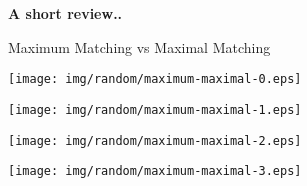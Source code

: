 \begin{frame}{}
	\centering \textbf{\huge A short review..}
\end{frame}

\begin{frame}{Maximum Matching vs Maximal Matching}
	\parbox[c][.7\textheight][c]{\textwidth}{%
{
	\begin{center}
    \texttt{[image: img/random/maximum-maximal-0.eps]}
	\end{center}
}
{
	\begin{center}
    \texttt{[image: img/random/maximum-maximal-1.eps]}
	\end{center}
}
{
	\begin{center}
    \texttt{[image: img/random/maximum-maximal-2.eps]}
	\end{center}
}
{
	\begin{center}
    \texttt{[image: img/random/maximum-maximal-3.eps]}
	\end{center}
}
}
\end{frame}

